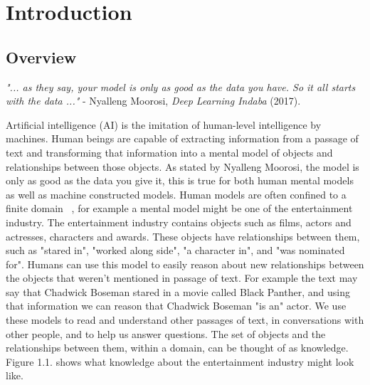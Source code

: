 
\chapter{Introduction}  %

\ifpdf
     \graphicspath{{Figs/Chapter1/}}
\else
    \graphicspath{{Chapter1/Figs/Vector/}{Chapter1/Figs/}}
\fi



\section{Overview} %

\emph{"... as they say, your model is only as good as the data you have. \newline So it all starts with the data ..."} \newline
\indent \indent - Nyalleng Moorosi, \emph{Deep Learning Indaba} (2017). \newline 

Artificial intelligence (AI) is the imitation of human-level intelligence by machines. Human beings are capable of extracting information from a passage of text and transforming that information into a mental model of objects and relationships between those objects. As stated by Nyalleng Moorosi, the model is only as good as the data you give it, this is true for both human mental models as well as machine constructed models. \newline 
Human models are often confined to a finite domain ~\citep{staab2010handbook}, for example a mental model might be one of the entertainment industry. The entertainment industry contains objects such as films, actors and actresses, characters and awards. These objects have relationships between them, such as "stared in", "worked along side", "a character in", and "was nominated for". Humans can use this model to easily reason about new relationships between the objects that weren't mentioned in passage of text. For example the text may say that Chadwick Boseman stared in a movie called Black Panther, and using that information we can reason that Chadwick Boseman "is an" actor. \newline
We use these models to read and understand other passages of text, in conversations with other people, and to help us answer questions. The set of objects and the relationships between them, within a domain, can be thought of as knowledge. Figure 1.1. shows what knowledge about the entertainment industry might look like. \newline

